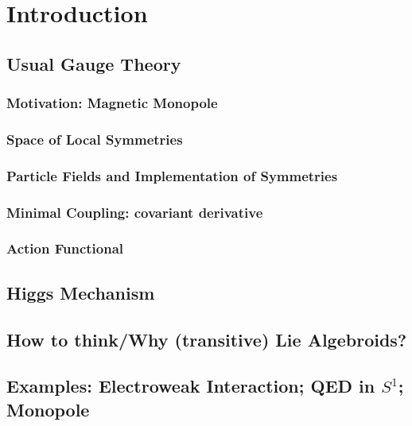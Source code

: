 \documentclass[12pt]{report}
\theoremstyle{definition}
\begin{document}
\chapter{Introduction}


\section{Usual Gauge Theory}
\subsection{Motivation: Magnetic Monopole}

\subsection{Space of Local Symmetries}

\subsection{Particle Fields and Implementation of Symmetries}

\subsection{Minimal Coupling: covariant derivative}

\subsection{Action Functional}

\section{Higgs Mechanism}

\section{How to think/Why (transitive) Lie Algebroids?}

\section{Examples: Electroweak Interaction; QED in $S^1$; Monopole}
\end{document}
